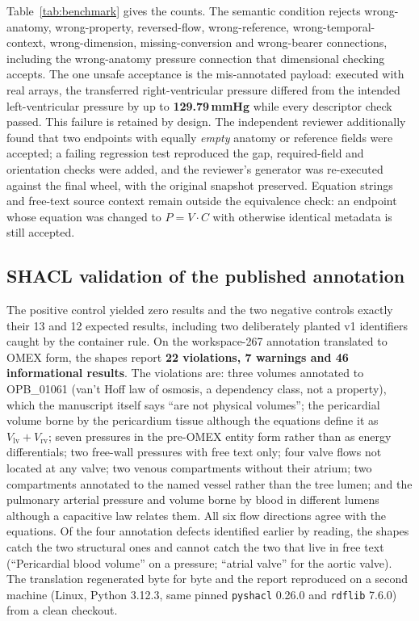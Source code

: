 \documentclass[11pt,letterpaper]{article}
\newcommand{\pkg}[1]{\texttt{#1}}
\begin{document}
Table~\ref{tab:benchmark} gives the counts. The semantic condition rejects wrong-anatomy, wrong-property, reversed-flow, wrong-reference, wrong-temporal-context, wrong-dimension, missing-conversion and wrong-bearer connections, including the wrong-anatomy pressure connection that dimensional checking accepts. The one unsafe acceptance is the mis-annotated payload: executed with real arrays, the transferred right-ventricular pressure differed from the intended left-ventricular pressure by up to \textbf{129.79\,mmHg} while every descriptor check passed. This failure is retained by design. The independent reviewer additionally found that two endpoints with equally \emph{empty} anatomy or reference fields were accepted; a failing regression test reproduced the gap, required-field and orientation checks were added, and the reviewer's generator was re-executed against the final wheel, with the original snapshot preserved. Equation strings and free-text source context remain outside the equivalence check: an endpoint whose equation was changed to $P=V\cdot C$ with otherwise identical metadata is still accepted.

\subsection{SHACL validation of the published annotation}

The positive control yielded zero results and the two negative controls exactly their 13 and 12 expected results, including two deliberately planted v1 identifiers caught by the container rule. On the workspace-267 annotation translated to OMEX form, the shapes report \textbf{22 violations, 7 warnings and 46 informational results}. The violations are: three volumes annotated to OPB\_01061 (van't Hoff law of osmosis, a dependency class, not a property), which the manuscript itself says ``are not physical volumes''; the pericardial volume borne by the pericardium tissue although the equations define it as $V_{\mathrm{lv}}+V_{\mathrm{rv}}$; seven pressures in the pre-OMEX entity form rather than as energy differentials; two free-wall pressures with free text only; four valve flows not located at any valve; two venous compartments without their atrium; two compartments annotated to the named vessel rather than the tree lumen; and the pulmonary arterial pressure and volume borne by blood in different lumens although a capacitive law relates them. All six flow directions agree with the equations. Of the four annotation defects identified earlier by reading, the shapes catch the two structural ones and cannot catch the two that live in free text (``Pericardial blood volume'' on a pressure; ``atrial valve'' for the aortic valve). The translation regenerated byte for byte and the report reproduced on a second machine (Linux, Python 3.12.3, same pinned \pkg{pyshacl} 0.26.0 and \pkg{rdflib} 7.6.0) from a clean checkout.
\end{document}
